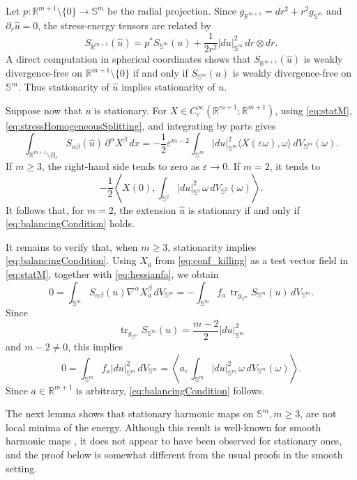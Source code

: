 \documentclass[11pt]{article}
\theoremstyle{plain}
\numberwithin{equation}{section}
\theoremstyle{definition}
\let\oldendproof\endproof
\renewenvironment{proof}[1][\proofname]{%
\oldproof[\upshape \bfseries #1]%
}{\oldendproof}
\def \R {\mathbb{R}}
\def \mb{\mathbb}
\DeclareMathOperator{\tr}{tr}
\begin{document}
\begin{proof}
Let $p\colon\R^{m+1}\setminus\{0\}\to\mb S^m$ be the radial
projection.  Since
$g_{\R^{m+1}}=dr^2+r^2g_{\mb S^m}$ and $\partial_r\hat u=0$, the
stress-energy tensors are related by
\begin{equation}
    \label{eq:stressHomogeneousSplitting}
    S_{\R^{m+1}}(\hat u)
    =p^*S_{\mb S^m}(u)
      +\frac{1}{2r^2}|du|_{\mb S^m}^2\,dr\otimes dr.
\end{equation}
A direct computation in spherical coordinates shows
that $S_{\R^{m+1}}(\hat u)$ is weakly divergence-free on
$\R^{m+1}\setminus\{0\}$ if and only if
$S_{\mb S^m}(u)$ is weakly divergence-free on $\mb S^m$.  Thus stationarity
of $\hat u$ implies stationarity of $u$.

Suppose now that $u$ is stationary.  For
$X\in C_c^\infty(\R^{m+1};\R^{m+1})$, using \eqref{eq:statM}, \eqref{eq:stressHomogeneousSplitting}, and integrating by parts gives
\begin{equation}
    \label{eq:stationarityDefect}
    \int_{\R^{m+1}\setminus B_\varepsilon}
      S_{\alpha\beta}(\hat u)\,\partial^\alpha X^\beta\,dx
    =-\frac12\varepsilon^{m-2}
      \int_{\mb S^m}|du|_{\mb S^m}^2
      \langle X(\varepsilon\omega),\omega\rangle
      \,dV_{\mb S^m}(\omega).
\end{equation}
If $m\geq3$, the right-hand side tends to zero as
$\varepsilon\to0$.  If $m=2$, it tends to
\[
    -\frac12\left\langle
      X(0),
      \int_{\mb S^2}|du|_{\mb S^2}^2\,\omega\,dV_{\mb S^2}(\omega)
    \right\rangle.
\]
It follows that, for $m=2$, the extension $\hat u$ is stationary if and
only if \eqref{eq:balancingCondition} holds.

It remains to verify that, when $m\geq 3$, stationarity implies \eqref{eq:balancingCondition}.  Using $X_a$
from \eqref{eq:conf_killing} as a test vector field in
\eqref{eq:statM}, together with \eqref{eq:hessianfa}, we obtain
\[
    0
    =\int_{\mb S^m}
      S_{\alpha\beta}(u)\nabla^\alpha X_a^\beta\,dV_{\mb S^m}
    =-\int_{\mb S^m}
      f_a\,\tr_{g_{\mb S^m}}S_{\mb S^m}(u)\,dV_{\mb S^m}.
\]
Since
\[
    \tr_{g_{\mb S^m}}S_{\mb S^m}(u)
    =\frac{m-2}{2}|du|_{\mb S^m}^2
\]
and $m-2\neq0$, this implies
\[
    0=\int_{\mb S^m}f_a|du|_{\mb S^m}^2\,dV_{\mb S^m}
    =\left\langle
      a,\int_{\mb S^m}|du|_{\mb S^m}^2\,\omega
      \,dV_{\mb S^m}(\omega)
    \right\rangle.
\]
Since $a\in\R^{m+1}$ is arbitrary, \eqref{eq:balancingCondition} follows.
\end{proof}

The next lemma shows that stationary harmonic maps on $\mb S^m, m\geq 3$, are not local minima of the energy. Although this result is well-known for smooth harmonic maps \cite{Xin1980}, it does not appear to have been observed for stationary ones, and the proof below is somewhat different from the usual proofs in the smooth setting.
\end{document}
